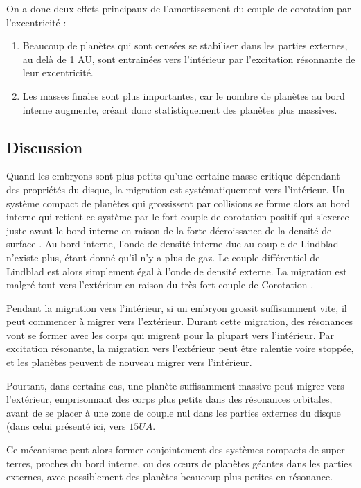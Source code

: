 On a donc deux effets principaux de l'amortissement du couple de corotation par l'excentricité : 
\begin{enumerate}
\item Beaucoup de planètes qui sont censées se stabiliser dans les parties externes, au delà de 1 AU, sont entrainées vers l'intérieur par l'excitation résonnante de leur excentricité. 
\item Les masses finales sont plus importantes, car le nombre de planètes au bord interne augmente, créant donc statistiquement des planètes plus massives. 
\end{enumerate}

\subsection{Discussion}
Quand les embryons sont plus petits qu'une certaine masse critique dépendant des propriétés du disque, la migration est systématiquement vers l'intérieur. Un système compact de planètes qui grossissent par collisions se forme alors au bord interne qui retient ce système par le fort couple de corotation positif qui s'exerce juste avant le bord interne en raison de la forte décroissance de la densité de surface \citep{masset2006disk}. Au bord interne, l'onde de densité interne due au couple de Lindblad n'existe plus, étant donné qu'il n'y a plus de gaz. Le couple différentiel de Lindblad est alors simplement égal à l'onde de densité externe. La migration est malgré tout vers l'extérieur en raison du très fort couple de Corotation \citep{masset2006disk}.

Pendant la migration vers l'intérieur, si un embryon grossit suffisamment vite, il peut commencer à migrer vers l'extérieur. Durant cette migration, des résonances vont se former avec les corps qui migrent pour la plupart vers l'intérieur. Par excitation résonante, la migration vers l'extérieur peut être ralentie voire stoppée, et les planètes peuvent de nouveau migrer vers l'intérieur. 

Pourtant, dans certains cas, une planète suffisamment massive peut migrer vers l'extérieur, emprisonnant des corps plus petits dans des résonances orbitales, avant de se placer à une zone de couple nul dans les parties externes du disque (dans celui présenté ici, vers $15\unit{UA}$.

\bigskip

Ce mécanisme peut alors former conjointement des systèmes compacts de super terres, proches du bord interne, ou des cœurs de planètes géantes dans les parties externes, avec possiblement des planètes beaucoup plus petites en résonance. 


